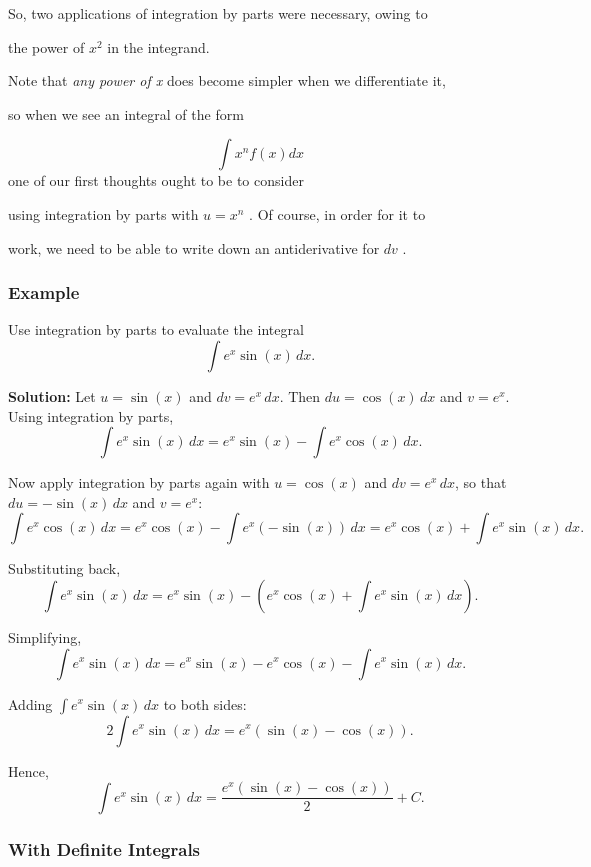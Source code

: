 So, two applications of integration by parts were necessary, owing to

the power of $x^2$ in the integrand.


Note that \textit{any power of x} does become simpler when we differentiate it,

so when we see an integral of the form


\[
\int x^nf(x)dx
\] one of our first thoughts ought to be to consider

using integration by parts with $u=x^n$ . Of course, in order for it to

work, we need to be able to write down an antiderivative for $dv$ .


\subsubsection{Example}
\label{sss:exam-1a79}

Use integration by parts to evaluate the integral
\[
\int e^x \sin(x)\,dx.
\]

\textbf{Solution:} Let $u = \sin(x)$ and $dv = e^x\,dx$. Then $du = \cos(x)\,dx$ and $v = e^x$. Using integration by parts,
\[
\int e^x \sin(x)\,dx = e^x \sin(x) - \int e^x \cos(x)\,dx.
\]

Now apply integration by parts again with $u = \cos(x)$ and $dv = e^x\,dx$, so that $du = -\sin(x)\,dx$ and $v = e^x$:
\[
\int e^x \cos(x)\,dx = e^x \cos(x) - \int e^x(-\sin(x))\,dx
= e^x \cos(x) + \int e^x \sin(x)\,dx.
\]

Substituting back,
\[
\int e^x \sin(x)\,dx = e^x \sin(x) - \left(e^x \cos(x) + \int e^x \sin(x)\,dx\right).
\]

Simplifying,
\[
\int e^x \sin(x)\,dx = e^x \sin(x) - e^x \cos(x) - \int e^x \sin(x)\,dx.
\]

Adding $\int e^x \sin(x)\,dx$ to both sides:
\[
2\int e^x \sin(x)\,dx = e^x(\sin(x) - \cos(x)).
\]

Hence,
\[
\int e^x \sin(x)\,dx = \frac{e^x(\sin(x) - \cos(x))}{2} + C.
\]

\subsubsection{With Definite Integrals}
\label{sss:with-3ba0}

